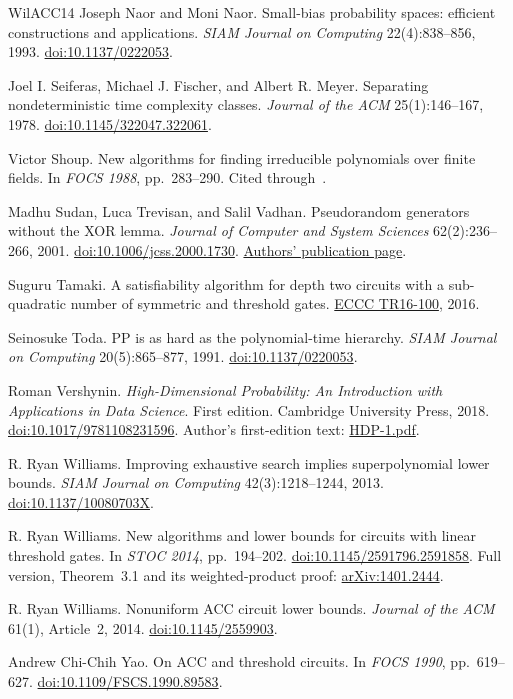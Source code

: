 \documentclass[11pt,letterpaper]{article}
\theoremstyle{definition}
\theoremstyle{remark}
\begin{document}
\begin{thebibliography}{WilACC14}
Joseph Naor and Moni Naor. Small-bias probability spaces: efficient
constructions and applications. \emph{SIAM Journal on Computing}
22(4):838--856, 1993.
\href{https://doi.org/10.1137/0222053}{doi:10.1137/0222053}.

Joel I. Seiferas, Michael J. Fischer, and Albert R. Meyer.
Separating nondeterministic time complexity classes.
\emph{Journal of the ACM} 25(1):146--167, 1978.
\href{https://doi.org/10.1145/322047.322061}{doi:10.1145/322047.322061}.

Victor Shoup. New algorithms for finding irreducible polynomials over
finite fields. In \emph{FOCS 1988}, pp.~283--290. Cited
through~\cite[Algorithm~17]{BCGT13}.

Madhu Sudan, Luca Trevisan, and Salil Vadhan.
Pseudorandom generators without the XOR lemma.
\emph{Journal of Computer and System Sciences} 62(2):236--266, 2001.
\href{https://doi.org/10.1006/jcss.2000.1730}{doi:10.1006/jcss.2000.1730}.
\href{https://people.seas.harvard.edu/~salil/research/noxor-abs.html}{Authors' publication page}.

Suguru Tamaki. A satisfiability algorithm for depth two circuits
with a sub-quadratic number of symmetric and threshold gates.
\href{https://eccc.weizmann.ac.il/report/2016/100/}{ECCC TR16-100}, 2016.

Seinosuke Toda. PP is as hard as the polynomial-time hierarchy.
\emph{SIAM Journal on Computing} 20(5):865--877, 1991.
\href{https://doi.org/10.1137/0220053}{doi:10.1137/0220053}.

Roman Vershynin. \emph{High-Dimensional Probability:
An Introduction with Applications in Data Science}. First edition.
Cambridge University Press, 2018.
\href{https://doi.org/10.1017/9781108231596}{doi:10.1017/9781108231596}.
Author's first-edition text:
\href{https://www.math.uci.edu/~rvershyn/papers/HDP-book/HDP-1.pdf}{HDP-1.pdf}.

R. Ryan Williams. Improving exhaustive search implies superpolynomial
lower bounds. \emph{SIAM Journal on Computing} 42(3):1218--1244, 2013.
\href{https://doi.org/10.1137/10080703X}{doi:10.1137/10080703X}.

R. Ryan Williams. New algorithms and lower bounds for circuits
with linear threshold gates. In \emph{STOC 2014}, pp.~194--202.
\href{https://doi.org/10.1145/2591796.2591858}{doi:10.1145/2591796.2591858}.
Full version, Theorem~3.1 and its weighted-product proof:
\href{https://arxiv.org/abs/1401.2444}{arXiv:1401.2444}.

R. Ryan Williams. Nonuniform ACC circuit lower bounds.
\emph{Journal of the ACM} 61(1), Article~2, 2014.
\href{https://doi.org/10.1145/2559903}{doi:10.1145/2559903}.

Andrew Chi-Chih Yao. On ACC and threshold circuits.
In \emph{FOCS 1990}, pp.~619--627.
\href{https://doi.org/10.1109/FSCS.1990.89583}{doi:10.1109/FSCS.1990.89583}.

\end{thebibliography}
\end{document}
